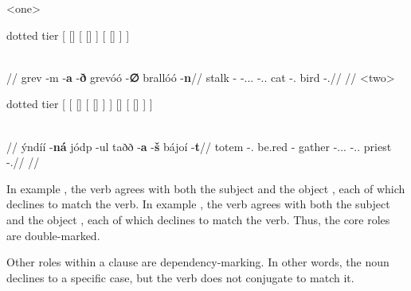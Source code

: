 	\a<one>\begingl
		\glpreamble{}\\
		\begin{forest} dotted tier
			[
				[]
				[
					[]
				]
				[
					[]
				]
			]
		\end{forest}\\
		//
		\gla grev -m -\textbf{a} -\textbf{ð} grevóó -\textbf{∅} brallóó -\textbf{n}//
		\glb stalk -\Prg{} -\At.\Dir.\Tps.\Prox{} -\Idr.\Tps.\Obv{} cat -\Dir.\Sg{} bird -\Idr.\Sg{}//
		\glft {}//
	\endgl
	\a<two>\begingl
		\glpreamble{}\\
		\begin{forest} dotted tier
			[
				[
					[]
					[
						[]
					]
				]
				[]
				[
					[]
				]
			]
		\end{forest}\\
		//
		\gla ýndíí -\textbf{ná} jódp -ul taðð -\textbf{a} -\textbf{š} bájoí -\textbf{t}//
		\glb totem -\Idr.\Pl{} be.red -\Ptcp{} gather -\At.\Dir.\Tps.\Prox{} -\Idr.\Tpp.\Obv{} priest -\Dir.\Pl//
		\glft {}//
	\endgl
\xe

In example , the verb  agrees with both the subject  and the object , each of which declines to match the verb. In example , the verb  agrees with both the subject  and the object , each of which declines to match the verb. Thus, the core roles are double-marked.

Other roles within a clause are dependency-marking. In other words, the noun declines to a specific case, but the verb does not conjugate to match it.

